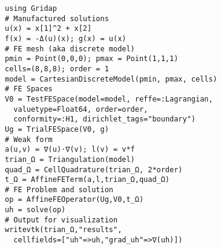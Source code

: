 \documentclass[11pt]{minimal}
\begin{document}
\begin{verbatim}
using Gridap
# Manufactured solutions
u(x) = x[1]^2 + x[2]
f(x) = -Δ(u)(x); g(x) = u(x)
# FE mesh (aka discrete model)
pmin = Point(0,0,0); pmax = Point(1,1,1)
cells=(8,8,8); order = 1
model = CartesianDiscreteModel(pmin, pmax, cells)
# FE Spaces
V0 = TestFESpace(model=model, reffe=:Lagrangian,
  valuetype=Float64, order=order,
  conformity=:H1, dirichlet_tags="boundary")
Ug = TrialFESpace(V0, g)
# Weak form
a(u,v) = ∇(u)⋅∇(v); l(v) = v*f
trian_Ω = Triangulation(model)
quad_Ω = CellQuadrature(trian_Ω, 2*order)
t_Ω = AffineFETerm(a,l,trian_Ω,quad_Ω)
# FE Problem and solution
op = AffineFEOperator(Ug,V0,t_Ω)
uh = solve(op)
# Output for visualization
writevtk(trian_Ω,"results",
  cellfields=["uh"=>uh,"grad_uh"=>∇(uh)])
\end{verbatim}   
\end{document}
